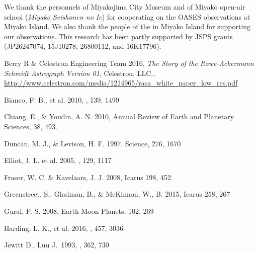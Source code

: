 \documentclass{pasj01}
\newcommand{\void}[1]{}
\renewcommand{\textcolor}{\void}
\begin{document}
\bigskip
We thank the personnels of Miyakojima City Museum
and of Miyako open-air school %
\textcolor{red}{
({\it Miyako Seishonen no Ie})
}
for cooperating 
on the OASES observations at Miyako Island.
We also thank the people of the in Miyako Island for supporting our observations.
This research has been partly supported by JSPS grants (JP26247074, 15J10278, 
\textcolor{red}{
26800112,
}
and 16K17796).

\begin{thebibliography}{} 

 Berry R \& Celestron Engineering Team 2016, 
{\it The Story of the Rowe-Ackermann Schmidt Astrograph Version 01}, Celestron, LLC., \\
\url{http://www.celestron.com/media/1214965/rasa_white_paper_low_res.pdf}

 Bianco, F. B., et al. 2010, \aj, 139, 1499


 Chiang, E., \& Youdin, A. N. 2010, Annual Review of Earth and Planetary Sciences, 38, 493.

  Duncan, M. J., \& Levison, H. F. 1997, Science, 276, 1670

 Elliot, J. L. et al. 2005, \aj, 129, 1117

 Fraser, W. C. \& Kavelaars, J. J. 2008, Icarus 198, 452

 Greenstreet, S., Gladman, B., \& McKinnon, W., B. 2015, Icarus 258, 267

Gural, P. S. 2008, Earth Moon Planets, 102, 269

 Harding, L. K., et al. 2016, \mnras, 457, 3036

 Jewitt D., Luu J.\ 1993, \nat, 362, 730 


\end{thebibliography}
\end{document}
